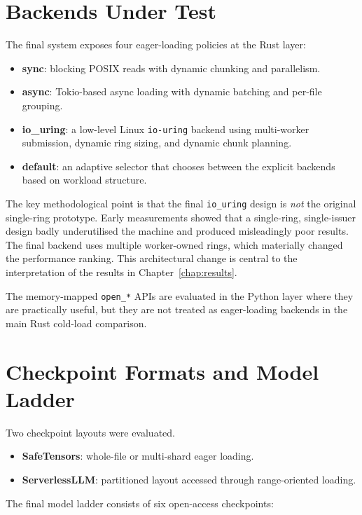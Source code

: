 \section{Backends Under Test}

The final system exposes four eager-loading policies at the Rust layer:

\begin{itemize}
\item \textbf{sync}: blocking POSIX reads with dynamic chunking and parallelism.
\item \textbf{async}: Tokio-based async loading with dynamic batching and per-file grouping.
\item \textbf{io\_uring}: a low-level Linux \texttt{io-uring} backend using multi-worker submission, dynamic ring sizing, and dynamic chunk planning.
\item \textbf{default}: an adaptive selector that chooses between the explicit backends based on workload structure.
\end{itemize}

The key methodological point is that the final \texttt{io\_uring} design is \emph{not} the original single-ring prototype. Early measurements showed that a single-ring, single-issuer design badly underutilised the machine and produced misleadingly poor results. The final backend uses multiple worker-owned rings, which materially changed the performance ranking. This architectural change is central to the interpretation of the results in Chapter~\ref{chap:results}.

The memory-mapped \texttt{open\_*} APIs are evaluated in the Python layer where they are practically useful, but they are not treated as eager-loading backends in the main Rust cold-load comparison.

\section{Checkpoint Formats and Model Ladder}

Two checkpoint layouts were evaluated.

\begin{itemize}
\item \textbf{SafeTensors}: whole-file or multi-shard eager loading.
\item \textbf{ServerlessLLM}: partitioned layout accessed through range-oriented loading.
\end{itemize}

The final model ladder consists of six open-access checkpoints:

